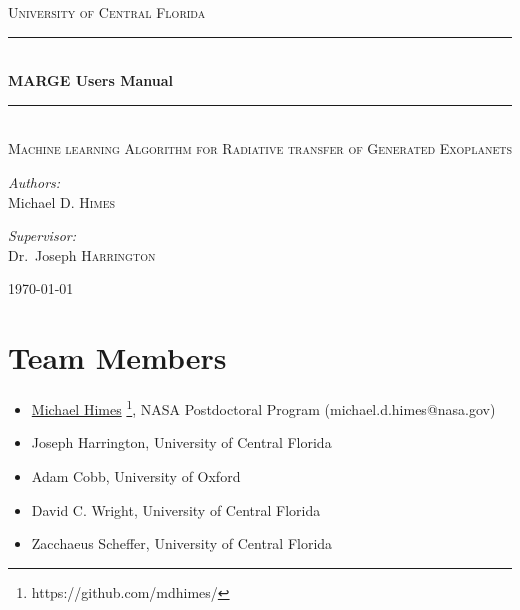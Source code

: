 \documentclass[letterpaper, 12pt]{article}
\begin{document}
\begin{titlepage}
\begin{center}

\textsc{\LARGE University of Central Florida}\\[1.5cm]

\rule{\linewidth}{0.5mm} \\[0.4cm]
{ \huge \bfseries MARGE Users Manual \\[0.4cm] }
\rule{\linewidth}{0.5mm} \\[1.0cm]

\textsc{\Large Machine learning Algorithm for Radiative transfer of Generated Exoplanets}\\[1.5cm]

\noindent
\begin{minipage}{0.4\textwidth}
\begin{flushleft}
\large
\emph{Authors:} \\
Michael D. \textsc{Himes} \\
\end{flushleft}
\end{minipage}%
\begin{minipage}{0.4\textwidth}
\begin{flushright} \large
\emph{Supervisor:} \\
Dr.~Joseph \textsc{Harrington}
\end{flushright}
\end{minipage}
\vfill

{\large \today}

\end{center}
\end{titlepage}

\tableofcontents
\newpage

\section{Team Members}
\label{sec:team}

\begin{itemize}
\item \href{https://github.com/mdhimes/}{Michael Himes}%
  \footnote{https://github.com/mdhimes/}, NASA 
      Postdoctoral Program (michael.d.himes@nasa.gov)
\item Joseph Harrington, University of Central Florida
\item Adam Cobb, University of Oxford
\item David C. Wright, University of Central Florida
\item Zacchaeus Scheffer, University of Central Florida
\end{itemize}
\end{document}
